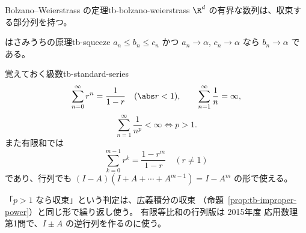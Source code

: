\begin{theorem}{Bolzano--Weierstrass の定理}{tb-bolzano-weierstrass}
$\R^d$ の有界な数列は、収束する部分列を持つ。
\end{theorem}

\begin{theorem}{はさみうちの原理}{tb-squeeze}
$a_n\le b_n\le c_n$ かつ $a_n\to\alpha$, $c_n\to\alpha$ なら $b_n\to\alpha$ である。
\end{theorem}

\begin{proposition}{覚えておく級数}{tb-standard-series}
\[
\sum_{n=0}^\infty r^n=\frac1{1-r}\quad(\abs r<1),
\qquad
\sum_{n=1}^\infty\frac1{n}=\infty,
\]
\[
\sum_{n=1}^\infty\frac1{n^p}<\infty\iff p>1.
\]
また有限和では
\[
\sum_{k=0}^{m-1}r^k=\frac{1-r^m}{1-r}\quad(r\ne1)
\]
であり、行列でも $(I-A)(I+A+\cdots+A^{m-1})=I-A^m$ の形で使える。
\end{proposition}

\begin{memo*}
「$p>1$ なら収束」という判定は、広義積分の収束
（命題~\ref{prop:tb-improper-power}）と同じ形で繰り返し使う。
有限等比和の行列版は 2015年度 応用数理 第1問で、$I\pm A$ の逆行列を作るのに使う。
\end{memo*}
